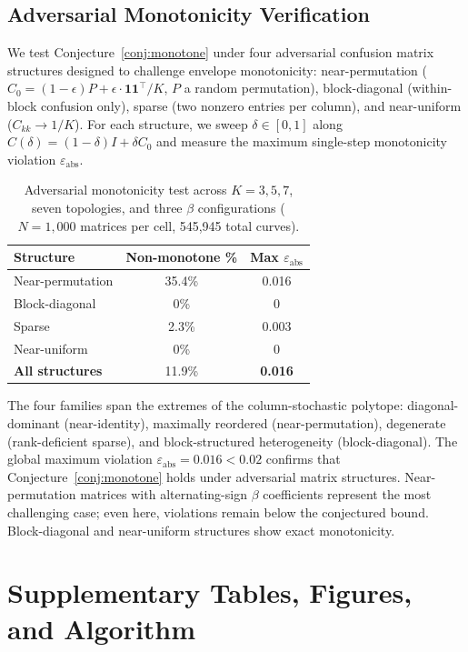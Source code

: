 \subsection{Adversarial Monotonicity Verification}
\label{app:adversarial_monotonicity}

We test Conjecture~\ref{conj:monotone} under four adversarial confusion matrix structures designed to challenge envelope monotonicity: near-permutation ($C_0 = (1{-}\epsilon)P + \epsilon \cdot \mathbf{1}\mathbf{1}^\top/K$, $P$ a random permutation), block-diagonal (within-block confusion only), sparse (two nonzero entries per column), and near-uniform ($C_{kk} \to 1/K$). For each structure, we sweep $\delta \in [0,1]$ along $C(\delta) = (1{-}\delta)I + \delta C_0$ and measure the maximum single-step monotonicity violation $\varepsilon_{\mathrm{abs}}$.

\begin{table}[h]
\centering
\small
\caption{Adversarial monotonicity test across $K{=}3,5,7$, seven topologies, and three $\beta$ configurations ($N{=}1{,}000$ matrices per cell, 545{,}945 total curves).}
\label{tab:adversarial_monotonicity}
\begin{tabular}{lcc}
\toprule
\textbf{Structure} & \textbf{Non-monotone \%} & \textbf{Max $\varepsilon_{\mathrm{abs}}$} \\
\midrule
Near-permutation & 35.4\% & 0.016 \\
Block-diagonal & 0\% & 0 \\
Sparse & 2.3\% & 0.003 \\
Near-uniform & 0\% & 0 \\
\midrule
\textbf{All structures} & 11.9\% & \textbf{0.016} \\
\bottomrule
\end{tabular}
\end{table}

The four families span the extremes of the column-stochastic polytope: diagonal-dominant (near-identity), maximally reordered (near-permutation), degenerate (rank-deficient sparse), and block-structured heterogeneity (block-diagonal). The global maximum violation $\varepsilon_{\mathrm{abs}} = 0.016 < 0.02$ confirms that Conjecture~\ref{conj:monotone} holds under adversarial matrix structures. Near-permutation matrices with alternating-sign $\beta$ coefficients represent the most challenging case; even here, violations remain below the conjectured bound. Block-diagonal and near-uniform structures show exact monotonicity.

\section{Supplementary Tables, Figures, and Algorithm}
\label{app:supplementary}

